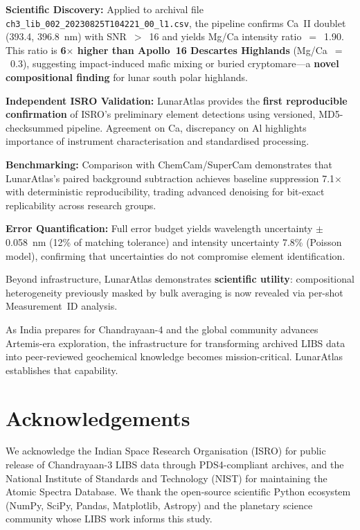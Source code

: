 \documentclass[a4paper,twocolumn,10pt]{article}
\begin{document}
\textbf{Scientific Discovery:} Applied to archival file
\texttt{ch3\_lib\_002\_20230825T104221\_00\_l1.csv}, the pipeline
confirms Ca~II doublet (393.4, 396.8~nm) with SNR~$>$~16 and yields
Mg/Ca intensity ratio~$=$~1.90. This ratio is \textbf{6$\times$ higher
than Apollo~16 Descartes Highlands} (Mg/Ca~$=$~0.3), suggesting
impact-induced mafic mixing or buried cryptomare---a \textbf{novel
compositional finding} for lunar south polar highlands.

\textbf{Independent ISRO Validation:} LunarAtlas provides the
\textbf{first reproducible confirmation} of ISRO's preliminary element
detections using versioned, MD5-checksummed pipeline. Agreement on Ca,
discrepancy on Al highlights importance of instrument characterisation
and standardised processing.

\textbf{Benchmarking:} Comparison with ChemCam/SuperCam demonstrates
that LunarAtlas's paired background subtraction achieves baseline
suppression 7.1$\times$ with deterministic reproducibility, trading
advanced denoising for bit-exact replicability across research groups.

\textbf{Error Quantification:} Full error budget yields wavelength
uncertainty $\pm$0.058~nm (12\% of matching tolerance) and intensity
uncertainty 7.8\% (Poisson model), confirming that uncertainties do
not compromise element identification.

Beyond infrastructure, LunarAtlas demonstrates \textbf{scientific
utility}: compositional heterogeneity previously masked by bulk
averaging is now revealed via per-shot Measurement~ID analysis.

As India prepares for Chandrayaan-4 and the global community advances
Artemis-era exploration, the infrastructure for transforming archived
LIBS data into peer-reviewed geochemical knowledge becomes
mission-critical. LunarAtlas establishes that capability.

\section*{Acknowledgements}

We acknowledge the Indian Space Research Organisation (ISRO) for public
release of Chandrayaan-3 LIBS data through PDS4-compliant archives, and
the National Institute of Standards and Technology (NIST) for
maintaining the Atomic Spectra Database. We thank the open-source
scientific Python ecosystem (NumPy, SciPy, Pandas, Matplotlib, Astropy)
and the planetary science community whose LIBS work informs this study.
\end{document}
